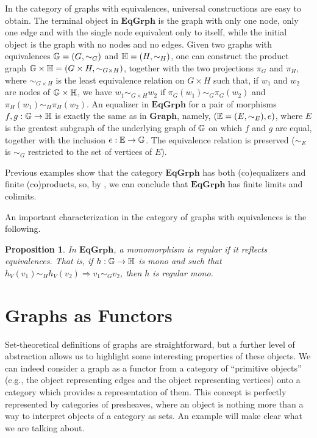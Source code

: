 \documentclass[a4paper, twoside,openright]{report}
\theoremstyle{plain}
\newtheorem{prop}[theorem]{Proposition}
\theoremstyle{definition}
\begin{document}
In the category of graphs with equivalences, universal constructions are easy to obtain. 
The terminal object in $\mathbf{EqGrph}$ is the graph with only one node, only one edge and with the single node equivalent only to itself, while the initial object is the graph with no nodes and no edges.
Given two graphs with equivalences $\mathbb{G} = (G, \sim_G) $ and $\mathbb{H} = (H, \sim_{H})$, one can construct the product graph $\mathbb{G \times H} = (G \times H, \sim_{G \times H})$, together with the two projections $\pi_G$ and $\pi_H$,  where $\sim_{G \times H}$ is the least equivalence relation on $G \times H$ such that, if $w_1$ and $w_2$ are nodes of $\mathbb{G \times H}$, we have $w_1 \sim_{G \times H} w_2$ if $\pi_G(w_1) \sim_G \pi_G(w_2)$ and $\pi_H(w_1) \sim_H \pi_H(w_2)$.
An equalizer in $\mathbf{EqGrph}$ for a pair of morphisms $f, g: \mathbb{G \rightarrow H}$ is exactly the same as in $\mathbf{Graph}$, namely, $(\mathbb{E} = (E, \sim_E), e)$, where $E$ is the greatest subgraph of the underlying graph of $\mathbb{G}$ on which $f$ and $g$ are equal, together with the inclusion $e: \mathbb{E \rightarrow G}$. The equivalence relation is preserved ($\sim_E$ is $\sim_G$ restricted to the set of vertices of $E$).

Previous examples show that the category $\mathbf{EqGrph}$ has both (co)equalizers and finite (co)products, so, by , we can conclude that $\mathbf{EqGrph}$ has finite limits and colimits.

An important characterization in the category of graphs with equivalences is the following.

\begin{prop}\label{prop:reg_mono_in_EG_are_mono_in_graph}
    In $\mathbf{EqGrph}$, a monomorphism is regular if it reflects equivalences. That is, if $h: \mathbb{G \rightarrow H}$ is mono and such that $h_V (v_1) \sim_H h_V(v_2) \Rightarrow v_1 \sim_G v_2$, then $h$ is regular mono.
\end{prop}



\section{Graphs as Functors}

Set-theoretical definitions of graphs are straightforward, but a further level of abstraction allows us to highlight some interesting properties of these objects. We can indeed consider a graph as a functor from a category of ``primitive objects'' (e.g., the object representing edges and the object representing vertices) onto a category which provides a representation of them. This concept is perfectly represented by categories of presheaves, where an object is nothing more than a way to interpret objects of a category as sets. An example will make clear what we are talking about.
\end{document}
